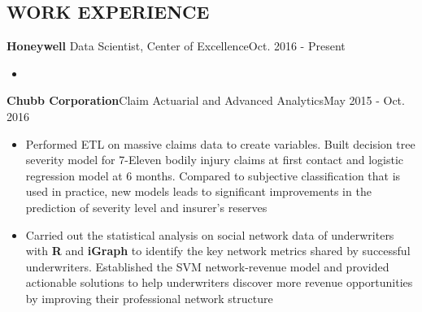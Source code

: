 \documentclass[10.5pt]{res} %
\begin{document}
\begin{resume}
\section{WORK EXPERIENCE} \parskip 11pt
	\textbf{Honeywell} \quad Data Scientist, Center of Excellence\hfill Oct. 2016 - Present
		\begin{itemize}
			\item 
		\end{itemize}
	\textbf{Chubb Corporation}\qquad Claim Actuarial and Advanced Analytics\hfill May 2015 - Oct. 2016
		\begin{itemize}
			\item Performed ETL on massive claims data to create variables. Built decision tree severity model for 7-Eleven bodily injury claims at first contact and logistic regression model at 6 months. Compared to subjective classification that is used in practice, new models leads to significant improvements in the prediction of severity level and insurer's reserves 
			\item  Carried out the statistical analysis 
					 on social network data of underwriters with \textbf{R} and \textbf{iGraph} to identify the key network metrics shared by successful underwriters. Established the SVM network-revenue model and provided actionable solutions to help underwriters discover more revenue opportunities by improving their professional network structure

\end{itemize}
\end{resume}
\end{document}
